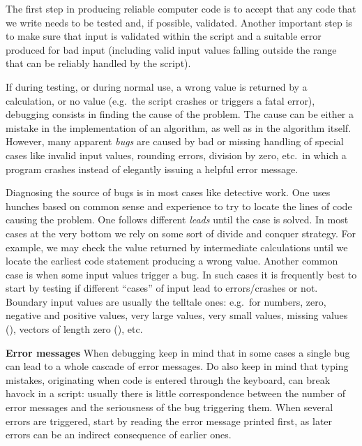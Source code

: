 \documentclass[krantz2]{krantz}\usepackage{knitr}%
\begin{document}
The first step in producing reliable computer code is to accept that any code that we write needs to be tested and, if possible, validated. Another important step is to make sure that input is validated within the script and a suitable error produced for bad input (including valid input values falling outside the range that can be reliably handled by the script).

If during testing, or during normal use, a wrong value is returned by a calculation, or no value (e.g.\ the script crashes or triggers a fatal error), debugging consists in finding the cause of the problem. The cause can be either a mistake in the implementation of an algorithm, as well as in the algorithm itself. However, many apparent \emph{bugs} are caused by bad or missing handling of special cases like invalid input values, rounding errors, division by zero, etc.\ in which a program crashes instead of elegantly issuing a helpful error message.

Diagnosing the source of bugs is in most cases like detective work. One uses hunches based on common sense and experience to try to locate the lines of code causing the problem. One follows different \emph{leads} until the case is solved. In most cases at the very bottom we rely on some sort of divide and conquer strategy. For example, we may check the value returned by intermediate calculations until we locate the earliest code statement producing a wrong value. Another common case is when some input values trigger a bug. In such cases it is frequently best to start by testing if different ``cases'' of input lead to errors/crashes or not. Boundary input values are usually the telltale ones: e.g.\ for numbers, zero, negative and positive values, very large values, very small values, missing values (), vectors of length zero (), etc.

\begin{warningbox}
  \textbf{Error messages} When debugging keep in mind that in some cases a single bug can lead to a whole cascade of error messages. Do also keep in mind that typing mistakes, originating when code is entered through the keyboard, can break havock in a script: usually there is little correspondence between the number of error messages and the seriousness of the bug triggering them. When several errors are triggered, start by reading the error message printed first, as later errors can be an indirect consequence of earlier ones.
\end{warningbox}
\end{document}
